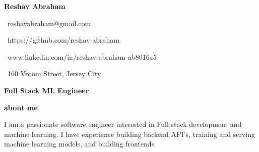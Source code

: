 \documentclass{article}
\begin{document}
\Huge\vspace{1em}\hspace{-0.30em}\textbf{Reshav Abraham} 
    \begin{minipage}[t]{0.45\textwidth\vspace{0em}\hspace{3.3em}} 
        \small
        \faEnvelopeO \, reshavabraham@gmail.com
        
        \faGithub \, https://github.com/reshav-abraham 

        \faLinkedin \, www.linkedin.com/in/reshav-abraham-ab8016a5

        \faHome \, 160 Vroom Street, Jersey City
    \end{minipage}

\vspace{-1.1em}\hspace{-0.2em}\Large\textbf{Full Stack ML Engineer} 

\vspace{0.5em}\hspace{0em}\small\textbf{about me} 

\begin{minipage}[t]{0.6\textwidth\hspace{0em}}
I am a passionate software engineer interested in Full stack development
and machine learning. I have experience building backend API's, training and serving machine learning models, and building frontends \par
\end{minipage}

\vspace{1.3em}
\end{document}
